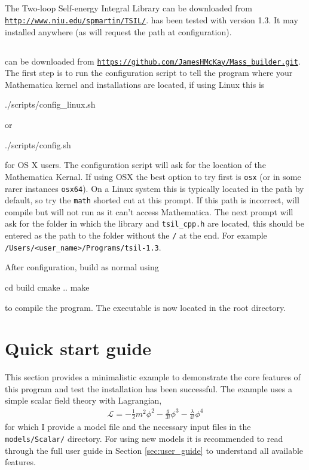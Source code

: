 \subsection{\tsil}
The Two-loop Self-energy Integral Library can be downloaded from \href{http://www.niu.edu/spmartin/TSIL/}{\lstinline{http://www.niu.edu/spmartin/TSIL/}}.  \mb has been tested with version 1.3. It may installed anywhere (as \mb will request the path at configuration).

\subsection{\mb}
\mb can be downloaded from \href{https://github.com/JamesHMcKay/Mass_builder.git}{\lstinline{https://github.com/JamesHMcKay/Mass_builder.git}}.  The first step is to run the configuration script to tell the program where your Mathematica kernel and \tsil installations are located, if using Linux this is
\begin{lstterm}
./scripts/config_linux.sh
\end{lstterm}
or
\begin{lstterm}
./scripts/config.sh
\end{lstterm}
for OS X users.  The configuration script will ask for the location of the Mathematica Kernal.  If using OSX the best option to try first is \lstinline{osx} (or in some rarer instances \lstinline{osx64}).  On a Linux system this is typically located in the path by default, so try the \lstinline{math} shorted cut at this prompt.  If this path is incorrect, \mb will compile but will not run as it can't access Mathematica.  The next prompt will ask for the folder in which the \tsil library and \lstinline{tsil_cpp.h} are located, this should be entered as the path to the folder without the \lstinline{/} at the end.  For example \lstinline{/Users/<user_name>/Programs/tsil-1.3}.

After configuration, build as normal using
\begin{lstterm}
cd build
cmake ..
make
\end{lstterm}
to compile the program.  The \mb executable is now located in the root directory.

\section{Quick start guide}

This section provides a minimalistic example to demonstrate the core features of this program and test the installation has been successful.  The example uses a simple scalar field theory with Lagrangian,
\begin{align}
\mathcal{L} = -\frac{1}{2}m^2\phi^2 - \frac{g}{3!}\phi^3-\frac{\lambda}{4!}\phi^4
\end{align}
for which I provide a \feynarts model file and the necessary \mb input files in the \lstinline{models/Scalar/} directory.  For using new models it is recommended to read through the full user guide in Section \ref{sec:user_guide} to understand all available features.

